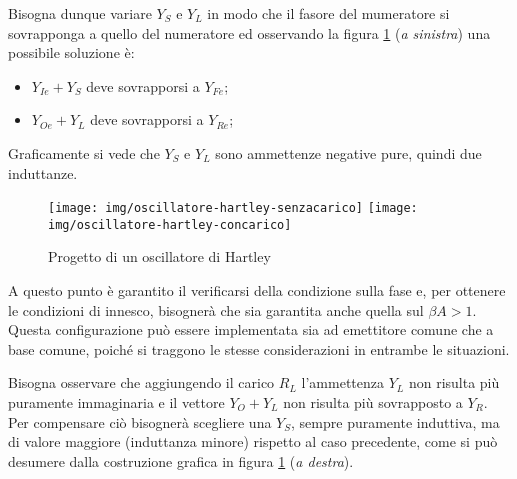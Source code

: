 Bisogna dunque variare $Y_S$ e $Y_L$ in modo che il fasore del mumeratore si sovrapponga a quello del numeratore ed osservando la figura \ref{fig:oscillatore-hartley-fasori} (\textit{a sinistra}) una possibile soluzione è:
\begin{itemize}
	\item $Y_{Ie} + Y_{S}$ deve sovrapporsi a $Y_{Fe}$;
	\item $Y_{Oe} + Y_{L}$ deve sovrapporsi a $Y_{Re}$;
\end{itemize}

Graficamente si vede che $Y_S$ e $Y_L$ sono ammettenze negative pure, quindi due induttanze.


\begin{figure}[htb]
	\centering
	\hspace{\fill}
	\texttt{[image: img/oscillatore-hartley-senzacarico]}
	\hspace{\fill}
	\texttt{[image: img/oscillatore-hartley-concarico]}
	\hspace{\fill}
	\caption{Progetto di un oscillatore di Hartley}
	\label{fig:oscillatore-hartley-fasori}
\end{figure}

A questo punto è garantito il verificarsi della condizione sulla fase e, per ottenere le condizioni di
innesco, bisognerà che sia garantita anche quella sul $\beta A > 1$. Questa configurazione può essere implementata sia ad emettitore comune che a base comune, poiché si traggono le stesse considerazioni in entrambe le situazioni.

Bisogna osservare che aggiungendo il carico $R_L$ l'ammettenza $Y_L$ non risulta più puramente
immaginaria e il vettore $Y_O +Y_L$ non risulta più sovrapposto a $Y_R$. Per compensare ciò
bisognerà scegliere una $Y_S$, sempre puramente induttiva, ma di valore maggiore (induttanza minore)
rispetto al caso precedente, come si può desumere dalla costruzione grafica in figura \ref{fig:oscillatore-hartley-fasori} (\textit{a destra}).

